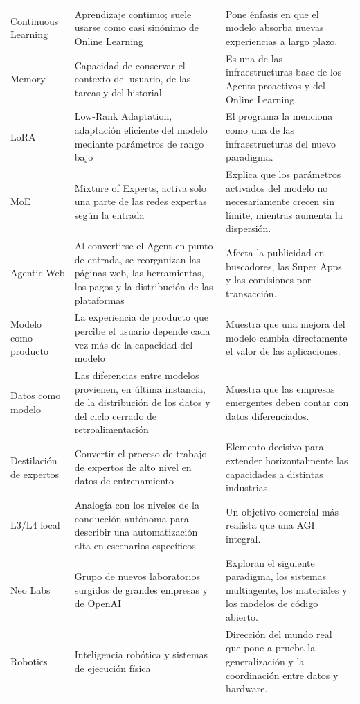 \begin{longtable}{p{}p{}p{}}
Continuous Learning & Aprendizaje continuo; suele usarse como casi sinónimo de Online Learning & Pone énfasis en que el modelo absorba nuevas experiencias a largo plazo. \\
Memory & Capacidad de conservar el contexto del usuario, de las tareas y del historial & Es una de las infraestructuras base de los Agents proactivos y del Online Learning. \\
LoRA & Low-Rank Adaptation, adaptación eficiente del modelo mediante parámetros de rango bajo & El programa la menciona como una de las infraestructuras del nuevo paradigma. \\
MoE & Mixture of Experts, activa solo una parte de las redes expertas según la entrada & Explica que los parámetros activados del modelo no necesariamente crecen sin límite, mientras aumenta la dispersión. \\
Agentic Web & Al convertirse el Agent en punto de entrada, se reorganizan las páginas web, las herramientas, los pagos y la distribución de las plataformas & Afecta la publicidad en buscadores, las Super Apps y las comisiones por transacción. \\
Modelo como producto & La experiencia de producto que percibe el usuario depende cada vez más de la capacidad del modelo & Muestra que una mejora del modelo cambia directamente el valor de las aplicaciones. \\
Datos como modelo & Las diferencias entre modelos provienen, en última instancia, de la distribución de los datos y del ciclo cerrado de retroalimentación & Muestra que las empresas emergentes deben contar con datos diferenciados. \\
Destilación de expertos & Convertir el proceso de trabajo de expertos de alto nivel en datos de entrenamiento & Elemento decisivo para extender horizontalmente las capacidades a distintas industrias. \\
L3/L4 local & Analogía con los niveles de la conducción autónoma para describir una automatización alta en escenarios específicos & Un objetivo comercial más realista que una AGI integral. \\
Neo Labs & Grupo de nuevos laboratorios surgidos de grandes empresas y de OpenAI & Exploran el siguiente paradigma, los sistemas multiagente, los materiales y los modelos de código abierto. \\
Robotics & Inteligencia robótica y sistemas de ejecución física & Dirección del mundo real que pone a prueba la generalización y la coordinación entre datos y hardware. \\
\bottomrule
\end{longtable}

